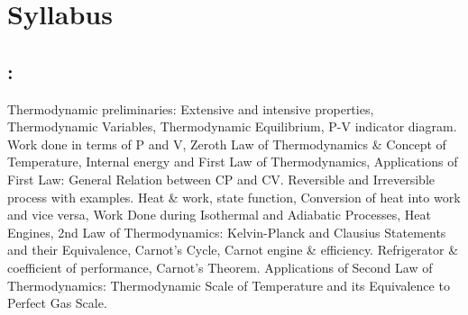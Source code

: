 \section*{Syllabus}

    \subsection*{\topicSubTitle: \topicTitle}
        Thermodynamic preliminaries: Extensive and intensive properties, Thermodynamic Variables, Thermodynamic Equilibrium, P-V indicator diagram. Work done in terms of P and V, Zeroth Law of Thermodynamics \& Concept of Temperature, Internal energy and First Law of Thermodynamics, Applications of First Law: General Relation between CP and CV. Reversible and Irreversible process with examples. Heat \& work, state function, Conversion of heat into work and vice versa, Work Done during Isothermal and Adiabatic Processes, Heat Engines, 2nd Law of Thermodynamics: Kelvin-Planck and Clausius Statements and their Equivalence, Carnot's Cycle, Carnot engine \& efficiency. Refrigerator \& coefficient of performance, Carnot's Theorem. Applications of Second Law of Thermodynamics: Thermodynamic Scale of Temperature and its Equivalence to Perfect Gas Scale.